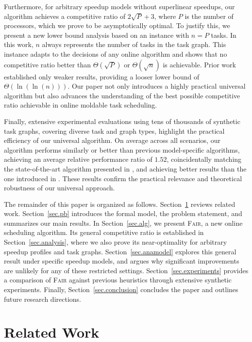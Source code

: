 \documentclass{article}
\newcommand\fair{\textsc{Fair}\xspace}
\begin{document}
Furthermore, for arbitrary speedup models without superlinear speedups, our algorithm achieves a competitive ratio of $2\sqrt{P}+3$, where $P$ is the number of processors, which we prove to be asymptotically optimal. To justify this, we present a new lower bound analysis based on an instance with $n = P$ tasks. In this work, $n$ always represents the number of tasks in the task graph. This instance adapts to the decisions of any online algorithm and shows that no competitive ratio better than $\Theta(\sqrt{P})$ or $\Theta(\sqrt{n})$ is achievable.
 Prior work~\cite{TOPC24} established only weaker results, providing a looser lower bound of $\Theta(\ln(\ln(n)))$. Our paper not only introduces a highly practical universal algorithm but also advances the understanding of the best possible competitive ratio achievable in online moldable task scheduling.


Finally, extensive experimental evaluations using tens of thousands of synthetic task graphs, covering diverse task and graph types, highlight the practical efficiency of our universal algorithm. On average across all scenarios, our algorithm performs similarly or better than previous model-specific algorithms, achieving an average relative performance ratio of $1.52$, coincidentally matching the state-of-the-art algorithm presented in \cite{TOPC24}, and achieving better results than the one introduced in  \cite{ICPP22}. These results confirm the practical relevance and theoretical robustness of our universal approach.

The remainder of this paper is organized as follows. Section~\ref{sec.related} reviews related work. Section~\ref{sec.pb} introduces the formal model, the problem statement, and summarizes our main results. In Section~\ref{sec.alg}, we present \fair, a new online scheduling algorithm. Its general competitive ratio is established in Section~\ref{sec.analysis}, where we also prove its near-optimality for arbitrary speedup profiles and task graphs. Section~\ref{sec.anamodel} explores this general result under specific speedup models, and argues why significant improvements are unlikely for any of these restricted settings. Section~\ref{sec.experiments} provides a comparison of \fair against previous heuristics through extensive synthetic experiments. Finally, Section~\ref{sec.conclusion} concludes the paper and outlines future research directions.


\section{Related Work}
\label{sec.related}
\end{document}
